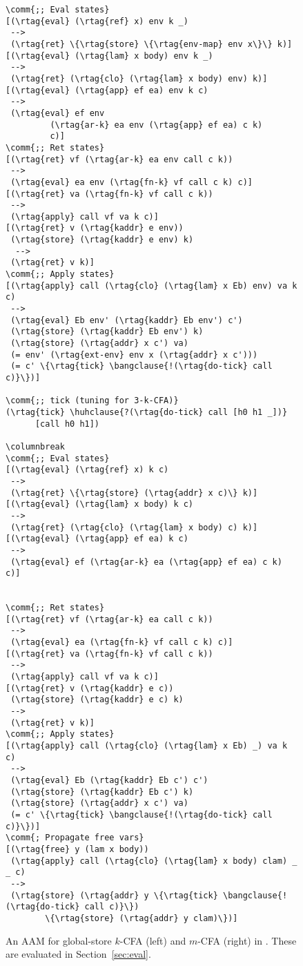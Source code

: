 \begin{figure*}
\begin{multicols}{2}
\begin{Verbatim}[baselinestretch=.75,commandchars=\\\{\}]
\comm{;; Eval states}
[(\rtag{eval} (\rtag{ref} x) env k _)
 -->
 (\rtag{ret} \{\rtag{store} \{\rtag{env-map} env x\}\} k)]
[(\rtag{eval} (\rtag{lam} x body) env k _)
 -->
 (\rtag{ret} (\rtag{clo} (\rtag{lam} x body) env) k)]
[(\rtag{eval} (\rtag{app} ef ea) env k c)
 -->
 (\rtag{eval} ef env
         (\rtag{ar-k} ea env (\rtag{app} ef ea) c k)
         c)]
\comm{;; Ret states}
[(\rtag{ret} vf (\rtag{ar-k} ea env call c k))
 -->
 (\rtag{eval} ea env (\rtag{fn-k} vf call c k) c)]
[(\rtag{ret} va (\rtag{fn-k} vf call c k))
 -->
 (\rtag{apply} call vf va k c)]
[(\rtag{ret} v (\rtag{kaddr} e env))
 (\rtag{store} (\rtag{kaddr} e env) k)
  --> 
 (\rtag{ret} v k)]
\comm{;; Apply states}
[(\rtag{apply} call (\rtag{clo} (\rtag{lam} x Eb) env) va k c)
 -->
 (\rtag{eval} Eb env' (\rtag{kaddr} Eb env') c')
 (\rtag{store} (\rtag{kaddr} Eb env') k)
 (\rtag{store} (\rtag{addr} x c') va)
 (= env' (\rtag{ext-env} env x (\rtag{addr} x c')))
 (= c' \{\rtag{tick} \bangclause{!(\rtag{do-tick} call c)}\})]

\comm{;; tick (tuning for 3-k-CFA)}
(\rtag{tick} \huhclause{?(\rtag{do-tick} call [h0 h1 _])}
      [call h0 h1])

\columnbreak
\comm{;; Eval states}
[(\rtag{eval} (\rtag{ref} x) k c)
 -->
 (\rtag{ret} \{\rtag{store} (\rtag{addr} x c)\} k)]
[(\rtag{eval} (\rtag{lam} x body) k c)
 -->
 (\rtag{ret} (\rtag{clo} (\rtag{lam} x body) c) k)]
[(\rtag{eval} (\rtag{app} ef ea) k c)
 -->
 (\rtag{eval} ef (\rtag{ar-k} ea (\rtag{app} ef ea) c k) c)]


\comm{;; Ret states}
[(\rtag{ret} vf (\rtag{ar-k} ea call c k))
 -->
 (\rtag{eval} ea (\rtag{fn-k} vf call c k) c)]
[(\rtag{ret} va (\rtag{fn-k} vf call c k))
 -->
 (\rtag{apply} call vf va k c)]
[(\rtag{ret} v (\rtag{kaddr} e c))
 (\rtag{store} (\rtag{kaddr} e c) k)
 -->
 (\rtag{ret} v k)]
\comm{;; Apply states}
[(\rtag{apply} call (\rtag{clo} (\rtag{lam} x Eb) _) va k c)
 -->
 (\rtag{eval} Eb (\rtag{kaddr} Eb c') c')
 (\rtag{store} (\rtag{kaddr} Eb c') k)
 (\rtag{store} (\rtag{addr} x c') va)
 (= c' \{\rtag{tick} \bangclause{!(\rtag{do-tick} call c)}\})]
\comm{; Propagate free vars}
[(\rtag{free} y (lam x body))
 (\rtag{apply} call (\rtag{clo} (\rtag{lam} x body) clam) _ _ c)
 -->
 (\rtag{store} (\rtag{addr} y \{\rtag{tick} \bangclause{!(\rtag{do-tick} call c)}\})
        \{\rtag{store} (\rtag{addr} y clam)\})]
\end{Verbatim}
\end{multicols}
\caption{An AAM for global-store $k$-CFA (left) and $m$-CFA (right) in \slog{}. These are evaluated in Section~\ref{sec:eval}.}
\label{fig:kcfa-mcfa}
\end{figure*}



